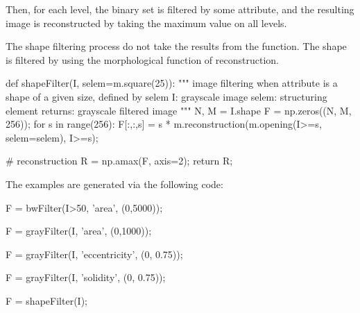 Then, for each level, the binary set is filtered by some attribute, and the resulting image is reconstructed by taking the maximum value on all levels.

The shape filtering process do not take the results from the  function. The shape is filtered by using the morphological function of reconstruction.
\begin{python}
def shapeFilter(I, selem=m.square(25)):
    """
    image filtering when attribute is a shape of a given size, defined by selem
    I: grayscale image
    selem: structuring element
    returns: grayscale filtered image
    """
    N, M = I.shape
    F = np.zeros((N, M, 256));
    for s in range(256):
        F[:,:,s] = s * m.reconstruction(m.opening(I>=s, selem=selem), I>=s);
    
    # reconstruction
    R = np.amax(F, axis=2);
    return R;
\end{python}

The examples are generated via the following code:
\begin{python}
F = bwFilter(I>50, 'area', (0,5000));

F = grayFilter(I, 'area', (0,1000));

F = grayFilter(I, 'eccentricity', (0, 0.75));

F = grayFilter(I, 'solidity', (0, 0.75));

F = shapeFilter(I);
\end{python}

